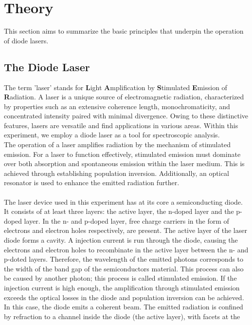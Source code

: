 \section{Theory}
\label{sec:theory}
This section aims to summarize the basic principles that underpin the operation of diode lasers.

\subsection{The Diode Laser}
\label{sec:diodelaser}
The term 'laser' stands for \textbf{L}ight \textbf{A}mplification by \textbf{S}timulated \textbf{E}mission of
\textbf{R}adiation. A laser is a unique source of electromagnetic radiation, characterized by
properties such as an extensive coherence length, monochromaticity, and concentrated intensity
paired with minimal divergence. Owing to these distinctive features, lasers are versatile and find
applications in various areas. Within this experiment, we employ a diode laser as a tool
for spectroscopic analysis.\\
\noindent
The operation of a laser amplifies radiation by the mechanism of stimulated emission. For a laser to function
effectively, stimulated emission must dominate over both absorption and spontaneous emission within the laser medium.
This is achieved through establishing population inversion. Additionally, an optical resonator is used to enhance the
emitted radiation further. \\
\\
\noindent
The laser device used in this experiment has at its core a semiconducting diode. It consists of at least three layers:
the active layer, the n-doped layer and the p-doped layer. In the n- and p-doped layer, free charge carriers in the
form of electrons and electron holes respectively, are present. The active layer of the laser diode forms a cavity. A
injection current is run through the diode, causing
the electrons and electron holes to recombinate in the active layer between the n- and p-doted layers.
Therefore, the wavelength of the emitted photons corresponds to the width of the band gap of the semiconductors
material. This process can also be caused by another photon; this process is called stimulated emission.
If the injection current is high enough, the amplification through stimulated emission exceeds the optical
losses in the diode and population inversion can be achieved. In this case, the diode emits a coherent beam.
The emitted radiation is confined by refraction to a channel inside the diode (the active layer), with facets at the
